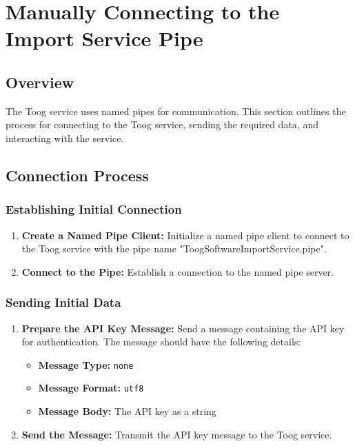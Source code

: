 \documentclass{memoir}
\begin{document}
	\section{Manually Connecting to the Import Service Pipe}
	
	\subsection{Overview}
	The Toog service uses named pipes for communication. This section outlines the process for connecting to the Toog service, sending the required data, and interacting with the service.
	
	\subsection{Connection Process}
	
	\subsubsection{Establishing Initial Connection}
	\begin{enumerate}
		\item \textbf{Create a Named Pipe Client:} Initialize a named pipe client to connect to the Toog service with the pipe name "ToogSoftwareImportService.pipe".
		\item \textbf{Connect to the Pipe:} Establish a connection to the named pipe server.
	\end{enumerate}
	
	\subsubsection{Sending Initial Data}
	\begin{enumerate}
		\item \textbf{Prepare the API Key Message:} Send a message containing the API key for authentication. The message should have the following details:
		\begin{itemize}
			\item \textbf{Message Type:} \texttt{none}
			\item \textbf{Message Format:} \texttt{utf8}
			\item \textbf{Message Body:} The API key as a string
		\end{itemize}
		\item \textbf{Send the Message:} Transmit the API key message to the Toog service.
	\end{enumerate}
	
\end{document}
